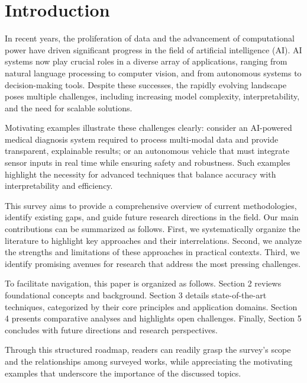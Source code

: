 \documentclass[sigconf]{acmart}
\begin{document}
\maketitle

\section{Introduction}

In recent years, the proliferation of data and the advancement of computational power have driven significant progress in the field of artificial intelligence (AI). AI systems now play crucial roles in a diverse array of applications, ranging from natural language processing to computer vision, and from autonomous systems to decision-making tools. Despite these successes, the rapidly evolving landscape poses multiple challenges, including increasing model complexity, interpretability, and the need for scalable solutions.

Motivating examples illustrate these challenges clearly: consider an AI-powered medical diagnosis system required to process multi-modal data and provide transparent, explainable results; or an autonomous vehicle that must integrate sensor inputs in real time while ensuring safety and robustness. Such examples highlight the necessity for advanced techniques that balance accuracy with interpretability and efficiency.

This survey aims to provide a comprehensive overview of current methodologies, identify existing gaps, and guide future research directions in the field. Our main contributions can be summarized as follows. First, we systematically organize the literature to highlight key approaches and their interrelations. Second, we analyze the strengths and limitations of these approaches in practical contexts. Third, we identify promising avenues for research that address the most pressing challenges.

To facilitate navigation, this paper is organized as follows. Section 2 reviews foundational concepts and background. Section 3 details state-of-the-art techniques, categorized by their core principles and application domains. Section 4 presents comparative analyses and highlights open challenges. Finally, Section 5 concludes with future directions and research perspectives.

Through this structured roadmap, readers can readily grasp the survey’s scope and the relationships among surveyed works, while appreciating the motivating examples that underscore the importance of the discussed topics.
\end{document}
